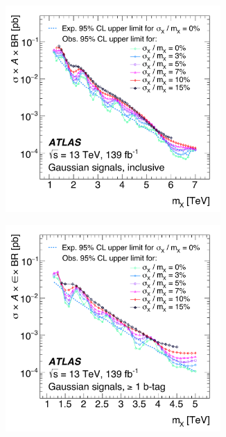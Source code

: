 \begin{figure}[!thbp]
  \begin{subfigure}{.5\textwidth}
  \centering
  \includegraphics[width=0.9\textwidth]{figs/fig_08a.pdf}
  \caption{}
  \end{subfigure}
  \begin{subfigure}{.5\textwidth}
  \centering
  \includegraphics[width=0.9\textwidth]{figs/fig_08b.pdf}
  \caption{}
  \end{subfigure}

\end{figure}
